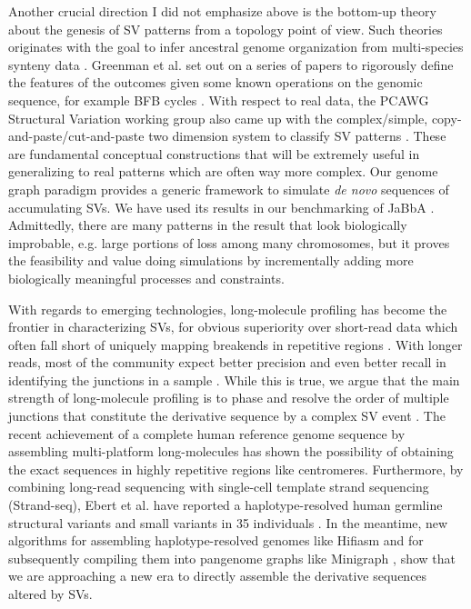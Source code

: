 \documentclass[phd,tocprelim]{cornell}
\begin{document}
Another crucial direction I did not emphasize above is the bottom-up theory about the genesis of SV patterns from a topology point of view. Such theories originates with the goal to infer ancestral genome organization from multi-species synteny data \cite{Medvedev:2010bm}. Greenman et al. set out on a series of papers to rigorously define the features of the outcomes given some known operations on the genomic sequence, for example BFB cycles \cite{greenman2016-ho}. With respect to real data, the PCAWG Structural Variation working group also came up with the complex/simple, copy-and-paste/cut-and-paste two dimension system to classify SV patterns \cite{Li2020sv}. These are fundamental conceptual constructions that will be extremely useful in generalizing to real patterns which are often way more complex. Our genome graph paradigm provides a generic framework to simulate \textit{de novo} sequences of accumulating SVs. We have used its results in our benchmarking of JaBbA . Admittedly, there are many patterns in the result that look biologically improbable, e.g. large portions of loss among many chromosomes, but it proves the feasibility and value doing simulations by incrementally adding more biologically meaningful processes and constraints.

With regards to emerging technologies, long-molecule profiling has become the frontier in characterizing SVs, for obvious superiority over short-read data which often fall short of uniquely mapping breakends in repetitive regions \cite{Behr2021-gf}. With longer reads, most of the community expect better precision and even better recall in identifying the junctions in a sample \cite{Zhao2021-bi}. While this is true, we argue that the main strength of long-molecule profiling is to phase and resolve the order of multiple junctions that constitute the derivative sequence by a complex SV event \cite{Behr2021-gf,Hadi2020-um,Luebeck2020-ow,Aganezov2020-cu}. The recent achievement of a complete human reference genome sequence by assembling multi-platform long-molecules \cite{Nurk2021-ro} has shown the possibility of obtaining the exact sequences in highly repetitive regions like centromeres. Furthermore, by combining long-read sequencing with single-cell template strand sequencing (Strand-seq), Ebert et al. have reported a haplotype-resolved human germline structural variants and small variants in 35 individuals \cite{Ebert2021-hl}. In the meantime, new algorithms for assembling haplotype-resolved genomes like Hifiasm \cite{Cheng2021-nh} and for subsequently compiling them into pangenome graphs like Minigraph \cite{Li2020-ai}, show that we are approaching a new era to directly assemble the derivative sequences altered by SVs.
\end{document}
